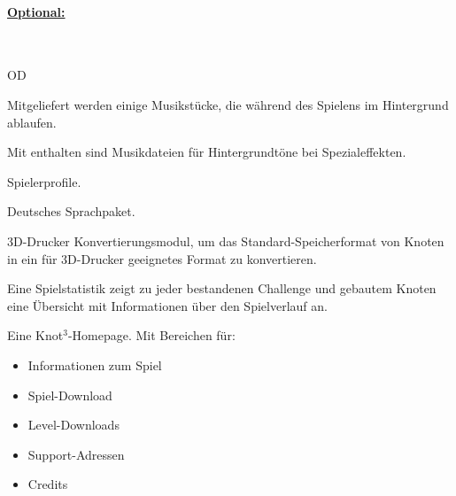 %
%
\paragraph*{\underline{Optional:}}~\\


\begin{ids}{\gls{OD}}

	\id[ 70] Mitgeliefert werden einige Musikstücke, die während des Spielens im Hintergrund ablaufen.

	\id[100] Mit enthalten sind Musikdateien für Hintergrundtöne bei Spezialeffekten.

	\id[200] Spielerprofile.
	
	\id[210] Deutsches Sprachpaket.
	
	\id[220] 3D-Drucker Konvertierungsmodul, um das Standard-Speicherformat von Knoten in ein für 3D-Drucker geeignetes Format zu konvertieren.
	
	\id[230] Eine Spielstatistik zeigt zu jeder bestandenen Challenge und gebautem Knoten eine Übersicht mit Informationen über den Spielverlauf an.
	
	\id[250] Eine Knot$^3$-Homepage. Mit Bereichen für:
	
	\begin{itemize}
		
		\item Informationen zum Spiel
		\item Spiel-Download
		\item Level-Downloads
		\item Support-Adressen
		\item Credits
	
	\end{itemize}
	
\end{ids}


